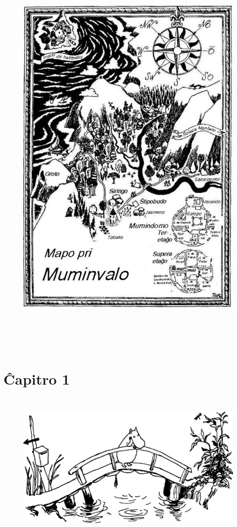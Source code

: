 \thispagestyle{empty}
\setcounter{page}{2}

\begin{figure}[htbp]
\centering
\includegraphics[width=395pt,height=580pt]{mapo.png}
\caption{}
\label{mapo}
\end{figure}

\chapter[Ĉapitro 1]{Ĉapitro 1}

\begin{figure}[htbp]
\centering
\includegraphics[width=400pt,height=211pt]{1-1.png}
\caption{}
\label{1-1}
\end{figure}

